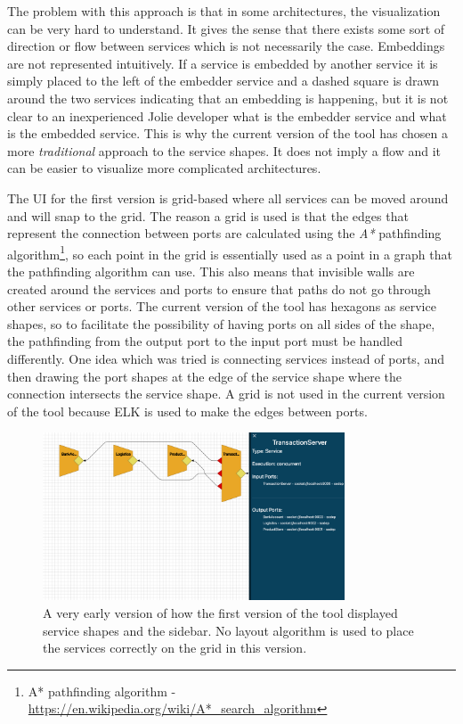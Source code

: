 The problem with this approach is that in some architectures, the visualization can be very hard to understand.
It gives the sense that there exists some sort of direction or flow between services which is not necessarily the case.
Embeddings are not represented intuitively. If a service is embedded by another service it is simply placed to the left of the embedder service and a dashed square is drawn around the two services indicating that an embedding is happening, but it 
is not clear to an inexperienced Jolie developer what is the embedder service and what is the embedded service.
This is why the current version of the tool has chosen a more \textit{traditional} approach to the service shapes. It does not imply a flow and it can be easier to visualize more complicated architectures.

The UI for the first version is grid-based where all services can be moved around and will snap to the grid.
The reason a grid is used is that the edges that represent the connection between ports are calculated using the \textit{A*} pathfinding algorithm\footnote{A* pathfinding algorithm - \url{https://en.wikipedia.org/wiki/A*_search_algorithm}}, so each point in the grid is essentially used as a point in a graph that the pathfinding algorithm can use.
This also means that invisible walls are created around the services and ports to ensure that paths do not go through other services or ports.
The current version of the tool has hexagons as service shapes, so to facilitate the possibility of having ports on all sides of the shape, the pathfinding from the output port to the input port must be handled differently.
One idea which was tried is connecting services instead of ports, and then drawing the port shapes at the edge of the service shape where the connection intersects the service shape.
A grid is not used in the current version of the tool because ELK is used to make the edges between ports.

\begin{figure}[t]
\center
\includegraphics[width=0.8\textwidth]{figures/old_ui.png}
\caption{A very early version of how the first version of the tool displayed service shapes and the sidebar. No layout algorithm is used to place the services correctly on the grid in this version.}
\label{figure:old_ui}
\end{figure}

